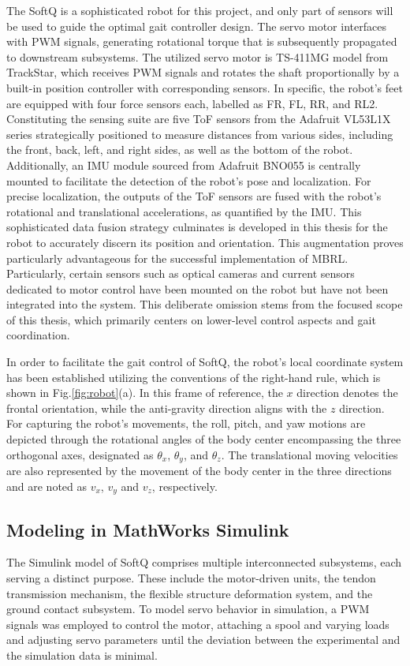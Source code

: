 The SoftQ is a sophisticated robot for this project, and only part of sensors will be used to guide the optimal gait controller design. The servo motor interfaces with \ac{PWM} signals, generating rotational torque  that is subsequently propagated to downstream subsystems. The utilized servo motor is TS-411MG model from TrackStar, which receives \ac{PWM} signals and rotates the shaft proportionally by a built-in position controller with corresponding sensors. In specific, the robot's feet are equipped with four force sensors each, labelled as \ac{FR}, \ac{FL}, \ac{RR}, and \ac{RL2}. Constituting the sensing suite are five \ac{ToF} sensors from the Adafruit VL53L1X series strategically positioned to measure distances from various sides, including the front, back, left, and right sides, as well as the bottom of the robot. Additionally, an \ac{IMU} module sourced from Adafruit BNO055 is centrally mounted to facilitate the detection of the robot's pose and localization. For precise localization, the outputs of the \ac{ToF} sensors are fused with the robot's rotational and translational accelerations, as quantified by the \ac{IMU}. This sophisticated data fusion strategy culminates is developed in this thesis for the robot to accurately discern its position and orientation. This augmentation proves particularly advantageous for the successful implementation of \ac{MBRL}. Particularly, certain sensors such as optical cameras and current sensors dedicated to motor control have been mounted on the robot but have not been integrated into the system. This deliberate omission stems from the focused scope of this thesis, which primarily centers on lower-level control aspects and gait coordination.

In order to facilitate the gait control of SoftQ, the robot's local coordinate system has been established utilizing the conventions of the right-hand rule, which is shown in Fig.\ref{fig:robot}(a). In this frame of reference, the $x$ direction denotes the frontal orientation, while the anti-gravity direction aligns with the $z$ direction. For capturing the robot's movements, the roll, pitch, and yaw motions are depicted through the rotational angles of the body center encompassing the three orthogonal axes, designated as $\theta_x$, $\theta_y$, and $\theta_z$. The translational moving velocities are also represented by the movement of the body center in the three directions and are noted as $v_x$, $v_y$ and $v_z$, respectively.

\subsection{Modeling in MathWorks Simulink\texorpdfstring{\textsuperscript{\textregistered}}{(R)}}
\label{sec3.2}
The Simulink model of SoftQ comprises multiple interconnected subsystems, each serving a distinct purpose. These include the motor-driven units, the tendon transmission mechanism, the flexible structure deformation system, and the ground contact subsystem. To model servo behavior in simulation, a \ac{PWM} signals was employed to control the motor, attaching a spool and varying loads and adjusting servo parameters until the deviation between the experimental and the simulation data is minimal. 

